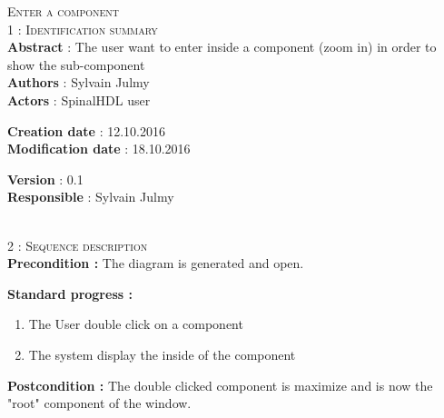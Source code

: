 \begin{flushleft}
    \textsc{\huge Enter a component}\\[0.5cm]

    \BlackLine
    \textsc{\Large 1 : Identification summary}\\[0.3cm]

        \textbf{\large Abstract} : The user want to enter inside a component (zoom in) in order to show the sub-component \\[0.1cm]

        \textbf{\large Authors} : Sylvain Julmy \\[0.3cm]

        \textbf{\large Actors} : SpinalHDL user \\[0.1cm]

    \begin{minipage}{0.40\textwidth}
        \begin{flushleft}	
            \textbf{\large Creation date} : 12.10.2016 \\[0.1cm]

            \textbf{\large Modification date} : 18.10.2016 \\[0.1cm]
        \end{flushleft}
    \end{minipage}
    \begin{minipage}{0.40\textwidth}
        \begin{flushleft}
            \textbf{\large Version} : 0.1 \\[0.1cm]

            \textbf{\large Responsible} : Sylvain Julmy \\[0.1cm]
        \end{flushleft}
    \end{minipage}
    \\[0.5cm]
    \BlackLine
    \textsc{\Large 2 : Sequence description}\\[0.3cm]

    \textbf{\large Precondition :} The diagram is generated and open.

    \textbf{\large  Standard progress :}
    \begin{enumerate}[nosep]
        \item The User double click on a component
        \item The system display the inside of the component
    \end{enumerate}

    \textbf{\large Postcondition :} The double clicked component is maximize and is now the "root" component of the window.


\end{flushleft}
